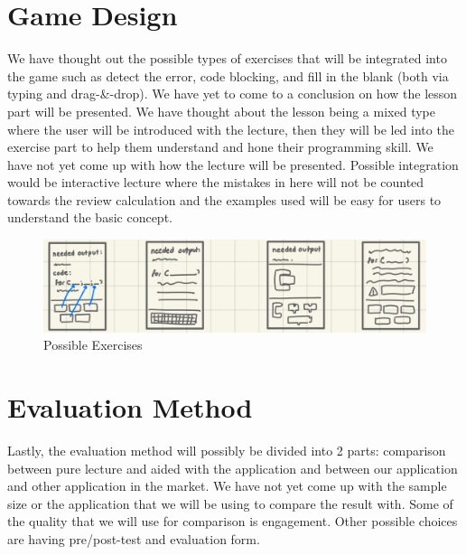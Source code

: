 \section{Game Design}
We have thought out the possible types of exercises that will be integrated into the game such as detect the error, code blocking, and fill in the blank (both via typing and drag-\&-drop). We have yet to come to a conclusion on how the lesson part will be presented. We have thought about the lesson being a mixed type where the user will be introduced with the lecture, then they will be led into the exercise part to help them understand and hone their programming skill. We have not yet come up with how the lecture will be presented. Possible integration would be interactive lecture where the mistakes in here will not be counted towards the review calculation and the examples used will be easy for users to understand the basic concept.
	\begin{figure}[!htbp]
		\centering
		\includegraphics[width = \textwidth]{Exercise.png}
		\caption{Possible Exercises}
		\label{fig:Exercises}
	\end{figure}

\section{Evaluation Method}
Lastly, the evaluation method will possibly be divided into 2 parts: comparison between pure lecture and aided with the application and between our application and other application in the market. We have not yet come up with the sample size or the application that we will be using to compare the result with. Some of the quality that we will use for comparison is engagement. Other possible choices are having pre/post-test and evaluation form.
